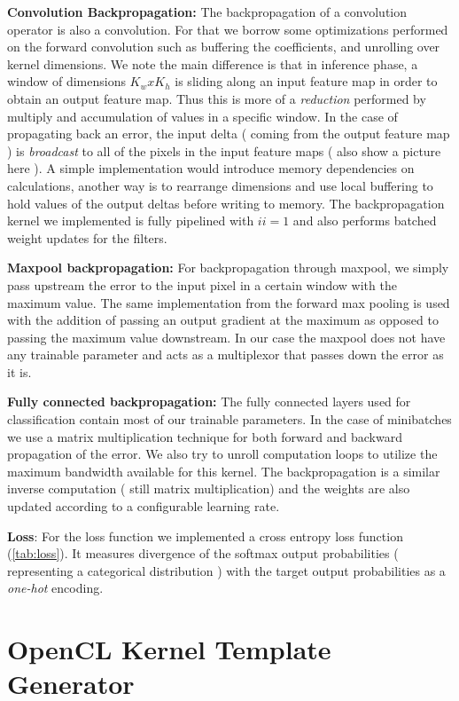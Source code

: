 \textbf{Convolution Backpropagation:} The backpropagation of a convolution operator is also a convolution. For that we borrow some optimizations performed on the forward convolution such as buffering the coefficients, and unrolling over kernel dimensions. We note the main difference is that in inference phase, a window of dimensions $ K_wxK_h $ is sliding along an input feature map in order to obtain an output feature map. Thus this is more of a \emph{reduction} performed by multiply and accumulation of values in a specific window. In the case of propagating back an error, the input delta ( coming from the output feature map ) is \emph{broadcast} to all of the pixels in the input feature maps ( also show a picture here ). A simple implementation would introduce memory dependencies on calculations, another way is to rearrange dimensions and use local buffering to hold values of the output deltas before writing to memory. The backpropagation kernel we implemented is fully pipelined with $ ii=1 $ and also performs batched weight updates for the filters.

\textbf{Maxpool backpropagation:} For backpropagation through maxpool, we simply pass upstream the error to the input pixel in a certain window with the maximum value. The same implementation from the forward max pooling is used with the addition of passing an output gradient at the maximum as opposed to passing the maximum value downstream. In our case the maxpool does not have any trainable parameter and acts as a multiplexor that passes down the error as it is. 

\textbf{Fully connected backpropagation:} The fully connected layers used for classification contain most of our trainable parameters. In the case of minibatches we use a matrix multiplication technique for both forward and backward propagation of the error. We also try to unroll computation loops to utilize the maximum bandwidth available for this kernel. The backpropagation is a similar inverse computation ( still matrix multiplication)  and the weights are also updated according to a configurable learning rate.

\textbf{Loss}: For the loss function we implemented a cross entropy loss function (\ref{tab:loss}). It measures divergence of the softmax output probabilities ( representing a categorical distribution ) with the target output probabilities as a \emph{one-hot} encoding.

\section{OpenCL Kernel Template Generator}

